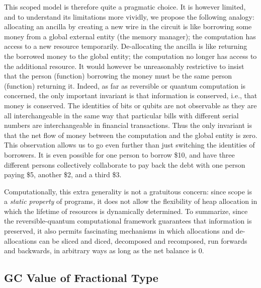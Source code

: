 \documentclass[sigplan,10pt,review,anonymous]{acmart}
\begin{document}
This scoped model is therefore quite a pragmatic choice. It is however
limited, and to understand its limitations more vividly, we propose
the following analogy: allocating an ancilla by creating a new wire in
the circuit is like borrowing some money from a global external
entity (the memory manager); the computation has access to a new resource
temporarily. De-allocating the ancilla is like returning the borrowed
money to the global entity; the computation no longer has access to
the additional resource. It would however be unreasonably restrictive
to insist that the person (function) borrowing the money must be
the same person (function) returning it.
Indeed, as far as reversible or quantum computation is concerned, the
only important invariant is that information is conserved, i.e., that
money is conserved. The identities of bits or qubits are not
observable as they are all interchangeable in the same way that
particular bills with different serial numbers are interchangeable in
financial transactions. Thus the only invariant is that the net flow
of money between the computation and the global entity is zero. This
observation allows us to go even further than just switching the
identities of borrowers. It is even possible for one person to borrow
\$10, and have three different persons collectively collaborate to
pay back the debt with one person paying \$5, another \$2, and a third
\$3.

Computationally, this extra generality is not a gratuitous concern:
since scope is a \emph{static property} of programs, it does
not allow the flexibility of heap allocation in which the lifetime of
resources is dynamically determined. To summarize, since the
reversible-quantum computational framework guarantees that information
is preserved, it also permits fascinating mechanisms in which
allocations and de-allocations can be sliced and diced, decomposed and
recomposed, run forwards and backwards, in arbitrary ways as long as
the net balance is 0.

\subsection{GC Value of Fractional Type}
\end{document}
